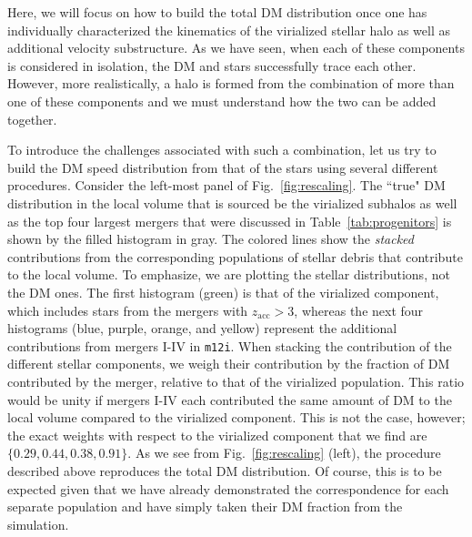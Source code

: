 \documentclass[twocolumn,preprintnumbers]{aastex6}
\DeclareRobustCommand{\Tab}[1]{Table~\ref{#1}}
\DeclareRobustCommand{\Fig}[1]{Fig.~\ref{#1}}
\newcommand{\zacc}{z_\mathrm{acc}}
\def\ML#1{\textcolor{red}{[ML: #1]}}
\newcommand{\mi}{\texttt{m12i}}
\begin{document}
Here, we will focus on how to build the total DM distribution once one has individually characterized the kinematics of the virialized stellar halo as well as additional velocity substructure.  As we have seen, when each of these components is considered in isolation, the DM and stars successfully trace each other.  However, more realistically, a halo is formed from the combination of more than one of these components and we must understand how the two can be added together.    
  
To introduce the challenges associated with such a combination, let us try to build the DM speed distribution from that of the stars using several different procedures.  Consider the left-most panel of \Fig{fig:rescaling}.  The ``true" DM distribution in the local volume that is sourced be the virialized subhalos as well as the top four largest mergers that were discussed in \Tab{tab:progenitors} is shown by the filled histogram in gray. The colored lines show the \emph{stacked} contributions from the corresponding populations of stellar debris that contribute to the local volume. To emphasize, we are plotting the stellar distributions, not the DM ones. The first histogram (green) is that of the virialized component, which includes stars from the mergers with $\zacc > 3$, whereas the next four histograms (blue, purple, orange, and yellow) represent the additional contributions from mergers I-IV in \mi.  When stacking the contribution of the different stellar components, we weigh their contribution by the fraction of DM contributed by the merger, relative to that of the virialized population.  This ratio would be unity if mergers I-IV each contributed the same amount of DM to the local volume compared to the virialized component.  This is not the case, however; the exact weights with respect to the virialized component that we find are $\{0.29, 0.44, 0.38, 0.91 \}$.  As we see from \Fig{fig:rescaling} (left), the procedure described above reproduces the total DM distribution.  Of course, this is to be expected given that we have already demonstrated the correspondence for each separate population and have simply taken their DM fraction from the simulation.  
\end{document}
